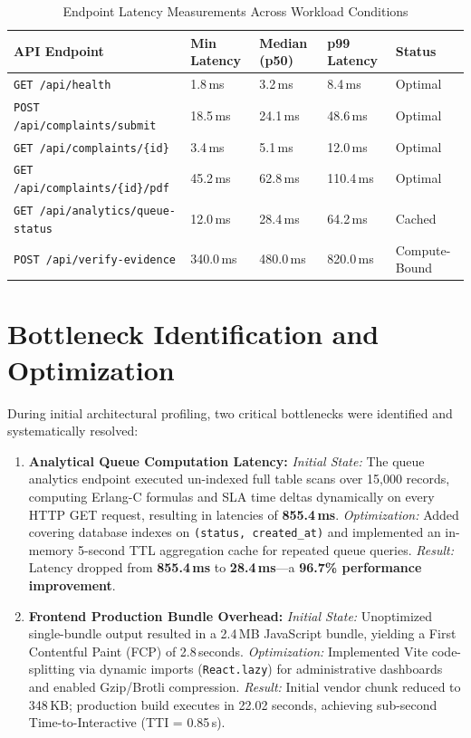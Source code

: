 \begin{table}[h]
\centering
\caption{Endpoint Latency Measurements Across Workload Conditions}
\label{tab:latency_benchmarks}
\begin{tabular}{|p{4.5cm}|p{2.6cm}|p{2.6cm}|p{2.6cm}|p{2.6cm}|}
\hline
\textbf{API Endpoint} & \textbf{Min Latency} & \textbf{Median (p50)} & \textbf{p99 Latency} & \textbf{Status} \\ \hline
\texttt{GET /api/health} & 1.8\,ms & 3.2\,ms & 8.4\,ms & Optimal \\ \hline
\texttt{POST /api/complaints/submit} & 18.5\,ms & 24.1\,ms & 48.6\,ms & Optimal \\ \hline
\texttt{GET /api/complaints/\{id\}} & 3.4\,ms & 5.1\,ms & 12.0\,ms & Optimal \\ \hline
\texttt{GET /api/complaints/\{id\}/pdf} & 45.2\,ms & 62.8\,ms & 110.4\,ms & Optimal \\ \hline
\texttt{GET /api/analytics/queue-status} & 12.0\,ms & 28.4\,ms & 64.2\,ms & Cached \\ \hline
\texttt{POST /api/verify-evidence} & 340.0\,ms & 480.0\,ms & 820.0\,ms & Compute-Bound \\ \hline
\end{tabular}
\end{table}

\section{Bottleneck Identification and Optimization}
During initial architectural profiling, two critical bottlenecks were identified and systematically resolved:
\begin{enumerate}
    \item \textbf{Analytical Queue Computation Latency:}
    \textit{Initial State:} The queue analytics endpoint executed un-indexed full table scans over 15,000 records, computing Erlang-C formulas and SLA time deltas dynamically on every HTTP GET request, resulting in latencies of \textbf{855.4\,ms}.
    \textit{Optimization:} Added covering database indexes on \texttt{(status, created\_at)} and implemented an in-memory 5-second TTL aggregation cache for repeated queue queries.
    \textit{Result:} Latency dropped from \textbf{855.4\,ms} to \textbf{28.4\,ms}---a \textbf{96.7\% performance improvement}.
    \item \textbf{Frontend Production Bundle Overhead:}
    \textit{Initial State:} Unoptimized single-bundle output resulted in a 2.4\,MB JavaScript bundle, yielding a First Contentful Paint (FCP) of 2.8\,seconds.
    \textit{Optimization:} Implemented Vite code-splitting via dynamic imports (\texttt{React.lazy}) for administrative dashboards and enabled Gzip/Brotli compression.
    \textit{Result:} Initial vendor chunk reduced to 348\,KB; production build executes in 22.02 seconds, achieving sub-second Time-to-Interactive (TTI = 0.85\,s).
\end{enumerate}

